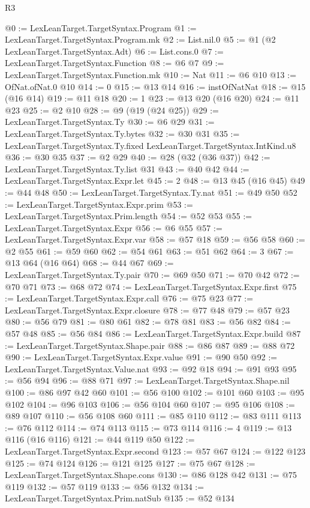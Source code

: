 \begin{lexlean}{R3}
\begin{coremodule}
@0 := LexLeanTarget.TargetSyntax.Program
@1 := LexLeanTarget.TargetSyntax.Program.mk
@2 := List.nil.{0}
@5 := @1 (@2 LexLeanTarget.TargetSyntax.Adt)
@6 := List.cons.{0}
@7 := LexLeanTarget.TargetSyntax.Function
@8 := @6 @7
@9 := LexLeanTarget.TargetSyntax.Function.mk
@10 := Nat
@11 := @6 @10
@13 := OfNat.ofNat.{0} @10
@14 := 0
@15 := @13 @14
@16 := instOfNatNat
@18 := @15 (@16 @14)
@19 := @11 @18
@20 := 1
@23 := @13 @20 (@16 @20)
@24 := @11 @23
@25 := @2 @10
@28 := @9 (@19 (@24 @25))
@29 := LexLeanTarget.TargetSyntax.Ty
@30 := @6 @29
@31 := LexLeanTarget.TargetSyntax.Ty.bytes
@32 := @30 @31
@35 := LexLeanTarget.TargetSyntax.Ty.fixed LexLeanTarget.TargetSyntax.IntKind.u8
@36 := @30 @35
@37 := @2 @29
@40 := @28 (@32 (@36 @37))
@42 := LexLeanTarget.TargetSyntax.Ty.list @31
@43 := @40 @42
@44 := LexLeanTarget.TargetSyntax.Expr.let
@45 := 2
@48 := @13 @45 (@16 @45)
@49 := @44 @48
@50 := LexLeanTarget.TargetSyntax.Ty.nat
@51 := @49 @50
@52 := LexLeanTarget.TargetSyntax.Expr.prim
@53 := LexLeanTarget.TargetSyntax.Prim.length
@54 := @52 @53
@55 := LexLeanTarget.TargetSyntax.Expr
@56 := @6 @55
@57 := LexLeanTarget.TargetSyntax.Expr.var
@58 := @57 @18
@59 := @56 @58
@60 := @2 @55
@61 := @59 @60
@62 := @54 @61
@63 := @51 @62
@64 := 3
@67 := @13 @64 (@16 @64)
@68 := @44 @67
@69 := LexLeanTarget.TargetSyntax.Ty.pair
@70 := @69 @50
@71 := @70 @42
@72 := @70 @71
@73 := @68 @72
@74 := LexLeanTarget.TargetSyntax.Expr.first
@75 := LexLeanTarget.TargetSyntax.Expr.call
@76 := @75 @23
@77 := LexLeanTarget.TargetSyntax.Expr.closure
@78 := @77 @48
@79 := @57 @23
@80 := @56 @79
@81 := @80 @61
@82 := @78 @81
@83 := @56 @82
@84 := @57 @48
@85 := @56 @84
@86 := LexLeanTarget.TargetSyntax.Expr.build
@87 := LexLeanTarget.TargetSyntax.Shape.pair
@88 := @86 @87
@89 := @88 @72
@90 := LexLeanTarget.TargetSyntax.Expr.value
@91 := @90 @50
@92 := LexLeanTarget.TargetSyntax.Value.nat
@93 := @92 @18
@94 := @91 @93
@95 := @56 @94
@96 := @88 @71
@97 := LexLeanTarget.TargetSyntax.Shape.nil
@100 := @86 @97 @42 @60
@101 := @56 @100
@102 := @101 @60
@103 := @95 @102
@104 := @96 @103
@106 := @56 @104 @60
@107 := @95 @106
@108 := @89 @107
@110 := @56 @108 @60
@111 := @85 @110
@112 := @83 @111
@113 := @76 @112
@114 := @74 @113
@115 := @73 @114
@116 := 4
@119 := @13 @116 (@16 @116)
@121 := @44 @119 @50
@122 := LexLeanTarget.TargetSyntax.Expr.second
@123 := @57 @67
@124 := @122 @123
@125 := @74 @124
@126 := @121 @125
@127 := @75 @67
@128 := LexLeanTarget.TargetSyntax.Shape.cons
@130 := @86 @128 @42
@131 := @75 @119
@132 := @57 @119
@133 := @56 @132
@134 := LexLeanTarget.TargetSyntax.Prim.natSub
@135 := @52 @134

\end{coremodule}
\end{lexlean}
